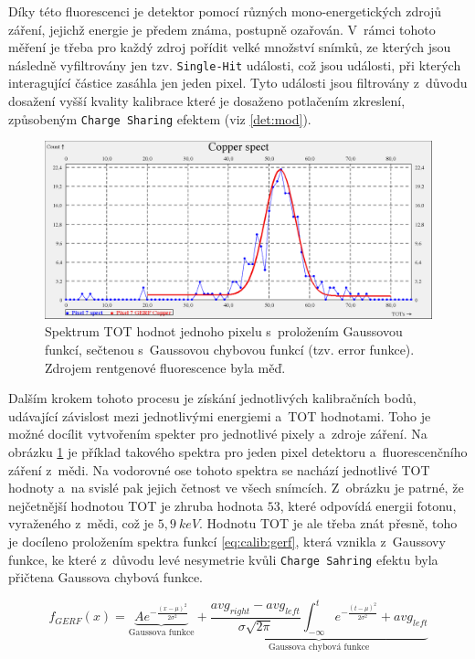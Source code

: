 Díky této fluorescenci je detektor pomocí různých mono-energetických zdrojů záření, jejichž energie je předem známa, postupně ozařován. V~rámci tohoto měření je třeba pro každý zdroj pořídit velké množství snímků, ze kterých jsou následně vyfiltrovány jen tzv. \texttt{Single-Hit} události, což jsou události, při kterých interagující částice zasáhla jen jeden pixel. Tyto události jsou filtrovány z~důvodu dosažení vyšší kvality kalibrace které je dosaženo potlačením zkreslení, způsobeným \texttt{Charge Sharing} efektem (viz \ref{det:mod}).

\begin{figure}[th]
	\begin{center}
		\includegraphics[width=14cm]{figures/calib_gerf.png}
		\caption{Spektrum TOT hodnot jednoho pixelu s~proložením Gaussovou funkcí, sečtenou s~Gaussovou chybovou funkcí (tzv. error funkce). Zdrojem rentgenové fluorescence byla měď.}
		\label{fig:calib:gerf}
	\end{center}
\end{figure}

Dalším krokem tohoto procesu je získání jednotlivých kalibračních bodů, udávající závislost mezi jednotlivými energiemi a~TOT hodnotami. Toho je možné docílit vytvořením spekter pro jednotlivé pixely a~zdroje záření. Na obrázku \ref{fig:calib:gerf} je příklad takového spektra pro jeden pixel detektoru a~fluorescenčního záření z~mědi. Na vodorovné ose tohoto spektra se nachází jednotlivé TOT hodnoty a~na svislé pak jejich četnost ve všech snímcích. Z~obrázku je patrné, že nejčetnější hodnotou TOT je zhruba hodnota $53$, které odpovídá energii fotonu, vyraženého z~mědi, což je $5,9~keV$. Hodnotu TOT je ale třeba znát přesně, toho je docíleno proložením spektra funkcí \ref{eq:calib:gerf}, která vznikla z~Gaussovy funkce, ke které z~důvodu levé nesymetrie kvůli \texttt{Charge Sahring} efektu byla přičtena Gaussova chybová funkce. 

\begin{equation}\label{eq:calib:gerf}
	f_{GERF}(x) = \underbrace{Ae^{ -\frac{(x-\mu)^2}{2\sigma^2} }}_{\text{Gaussova funkce}} +
	\underbrace{ \frac{avg_{right} - avg_{left}}{\sigma\sqrt{2\pi}} \int_{-\infty}^t e^{ -\frac{(t-\mu)^2}{2\sigma^2} } + avg_{left}}_{\text{Gaussova chybová funkce}}
\end{equation}

